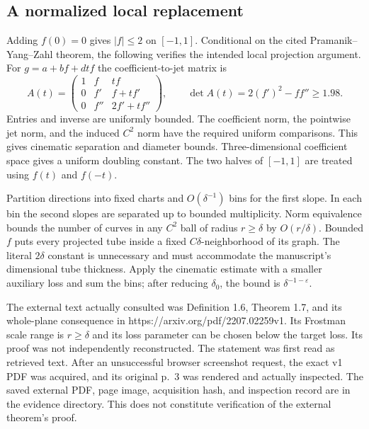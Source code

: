 \documentclass[10pt]{article}
\begin{document}
\subsection*{A normalized local replacement}
Adding \(f(0)=0\) gives \(|f|\le2\) on \([-1,1]\). Conditional on the cited Pramanik–Yang–Zahl theorem, the following verifies the intended local projection argument. For \(g=a+bf+dtf\) the coefficient-to-jet matrix is \[A(t)=
 \begin{pmatrix}
 1&f&tf\\0&f'&f+tf'\\0&f''&2f'+tf''
 \end{pmatrix},\qquad
 \det A(t)=2(f')^2-ff''\ge1.98.\] Entries and inverse are uniformly bounded. The coefficient norm, the pointwise jet norm, and the induced \(C^2\) norm have the required uniform comparisons. This gives cinematic separation and diameter bounds. Three-dimensional coefficient space gives a uniform doubling constant. The two halves of \([-1,1]\) are treated using \(f(t)\) and \(f(-t)\).\par
Partition directions into fixed charts and \(O(\delta^{-1})\) bins for the first slope. In each bin the second slopes are separated up to bounded multiplicity. Norm equivalence bounds the number of curves in any \(C^2\) ball of radius \(r\ge\delta\) by \(O(r/\delta)\). Bounded \(f\) puts every projected tube inside a fixed \(C\delta\)-neighborhood of its graph. The literal \(2\delta\) constant is unnecessary and must accommodate the manuscript’s dimensional tube thickness. Apply the cinematic estimate with a smaller auxiliary loss and sum the bins; after reducing \(\delta_0\), the bound is \(\delta^{-1-\varepsilon}\).\par
The external text actually consulted was Definition 1.6, Theorem 1.7, and its whole-plane consequence in https://arxiv.org/pdf/2207.02259v1. Its Frostman scale range is \(r\ge\delta\) and its loss parameter can be chosen below the target loss. Its proof was not independently reconstructed. The statement was first read as retrieved text. After an unsuccessful browser screenshot request, the exact v1 PDF was acquired, and its original p. 3 was rendered and actually inspected. The saved external PDF, page image, acquisition hash, and inspection record are in the evidence directory. This does not constitute verification of the external theorem’s proof.\par
\end{document}
